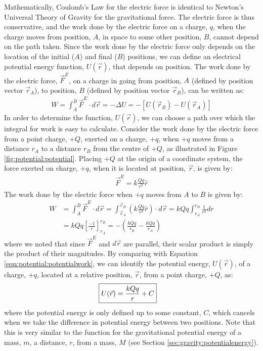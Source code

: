 Mathematically, Coulomb's Law for the electric force is identical to Newton's Universal Theory of Gravity for the gravitational force. The electric force is thus conservative, and the work done by the electric force on a charge, $q$, when the charge moves from position, $A$, in space to some other position, $B$, cannot depend on the path taken. Since the work done by the electric force only depends on the location of the initial ($A$) and final ($B$) positions, we can define an electrical potential energy function, $U(\vec r)$, that depends on position. The work done by the electric force, $\vec F^E$,  on a charge in going from position, $A$ (defined by position vector $\vec r_A$), to position, $B$ (defined by position vector $\vec r_B$), can be written as:
\begin{align}
\label{eqn:potential:potentialwork}
W=\int_A^B \vec F^E\cdot d\vec r=-\Delta U=-\left[ U(\vec r_B)-U(\vec r_A) \right]
\end{align}
In order to determine the function, $U(\vec r)$, we can choose a path over which the integral for work is easy to calculate. Consider the work done by the electric force from a point charge, $+Q$, exerted on a charge, $+q$, when $+q$ moves from a distance $r_A$ to a distance $r_B$ from the centre of $+Q$, as illustrated in Figure \ref{fig:potential:potential}.
Placing $+Q$ at the origin of a coordinate system, the force exerted on charge, $+q$, when it is located at position, $\vec r$, is given by:
\begin{align*}
\vec F^E=k\frac{Qq}{r^2}\hat r
\end{align*}
The work done by the electric force when $+q$ moves from $A$ to $B$ is given by:
\begin{align*}
W&=\int_A^B \vec F^E\cdot d\vec r=\int_{\vec r_A}^{\vec r_B} \left(k\frac{Qq}{r^2}\hat r\right)\cdot d\vec r=kQq \int_{r_A}^{r_B} \frac{1}{r^2}dr\\
&=kQq \left[\frac{-1}{r} \right]_{r_A}^{r_B}=-\left(\frac{kQq}{r_B}-\frac{kQq}{r_A}\right)
\end{align*}
where we noted that since $\vec F^E$ and $d\vec r$ are parallel, their scalar product is simply the product of their magnitudes. By comparing with Equation \ref{eqn:potential:potentialwork}, we can identify the potential energy, $U(\vec r)$, of a charge, $+q$, located at a relative position, $\vec r$, from a point charge, $+Q$, as:
\begin{align*}
\Aboxed{U(\vec r)=\frac{kQq}{r}+C}
\end{align*}
where the potential energy is only defined up to some constant, $C$, which cancels when we take the difference in potential energy between two positions. Note that this is very similar to the function for the gravitational potential energy of a mass, $m$, a distance, $r$, from a mass, $M$ (see Section \ref{sec:gravity:potentialenergy}).

